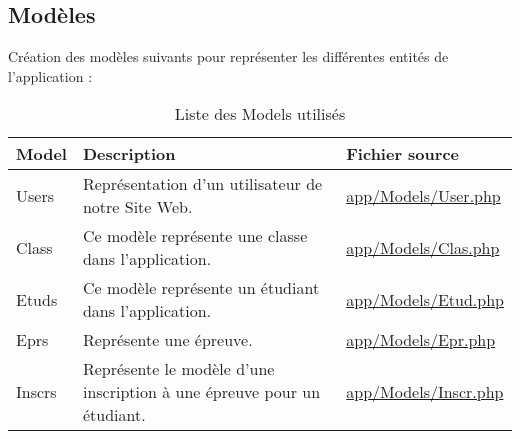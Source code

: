 \subsection{Modèles}

Création des modèles suivants pour représenter les différentes entités de l'application :

\begin{table}[H]
	\begin{adjustbox}{width=\textwidth}
		\begin{tabular}{|l|p{}|p{}|}
			\hline
			\textbf{Model} & \textbf{Description} & \textbf{Fichier source} \\
			\hline
			Users & Représentation d'un utilisateur de notre Site Web. & \url{app/Models/User.php} \\
			Class & Ce modèle représente une classe dans l'application. &	\url{app/Models/Clas.php} \\
			Etuds & Ce modèle représente un étudiant dans l'application. &	\url{app/Models/Etud.php} \\
			Eprs & Représente une épreuve. &	\url{app/Models/Epr.php} \\
			Inscrs & Représente le modèle d'une inscription à une épreuve pour un étudiant. &	\url{app/Models/Inscr.php} \\
			\hline
		\end{tabular}
	\end{adjustbox}
	\caption{Liste des Models utilisés}
\end{table}